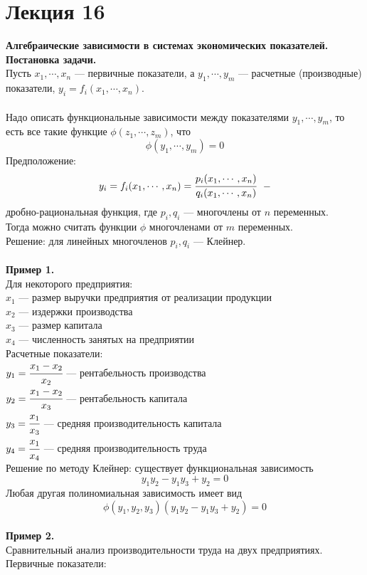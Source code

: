 \documentclass[12pt]{article}
\theoremstyle{definition}
\numberwithin{equation}{section}
\begin{document}
\section *{Лекция 16}
\noindent\textbf{Алгебраические зависимости в системах экономических показателей.}\\
\textbf{Постановка задачи.}\\
Пусть $x_1,\cdots,x_n$ --- первичные показатели, а $y_1, \cdots, y_m$ --- расчетные (производные) показатели, $y_i=f_i(x_1,\cdots,x_n)$.\\
\\
Надо описать функциональные зависимости между показателями $y_1,\cdots,y_m$, то есть все такие функцие $\phi(z_1,\cdots,z_m)$, что $$\phi(y_1,\cdots,y_m)=0$$
Предположение:
$$y_i=f_i(x_1,\cdots,x_n)=\cfrac{p_i(x_1,\cdots,x_n)}{q_i(x_1,\cdots,x_n)} ~~-$$
дробно-рациональная функция, где $p_i, q_i$ --- многочлены от $n$ переменных.\\
Тогда можно считать функции $\phi$ многочленами от $m$ переменных.\\
Решение: для линейных многочленов $p_i, q_i$ --- Клейнер.\\
\\
\textbf{Пример 1.}\\
Для некоторого предприятия:\\
$x_1$ --- размер выручки предприятия от реализации продукции\\
$x_2$ --- издержки производства\\
$x_3$ --- размер капитала\\
$x_4$ --- численность занятых на предприятии\\
Расчетные показатели:\\
$y_1=\cfrac{x_1-x_2}{x_2}$ --- рентабельность производства\\
$y_2=\cfrac{x_1-x_2}{x_3}$ --- рентабельность капитала\\
$y_3=\cfrac{x_1}{x_3}$ --- средняя производительность капитала\\
$y_4=\cfrac{x_1}{x_4}$ --- средняя производительность труда\\
Решение по методу Клейнер: существует функциональная зависимость $$y_1y_2-y_1y_3+y_2=0$$
Любая другая полиномиальная зависимость имеет вид $$\phi(y_1, y_2, y_3)(y_1y_2-y_1y_3+y_2)=0$$
\\
\textbf{Пример 2.}\\
Сравнительный анализ производительности труда на двух предприятиях.\\
Первичные показатели:\\
\end{document}
